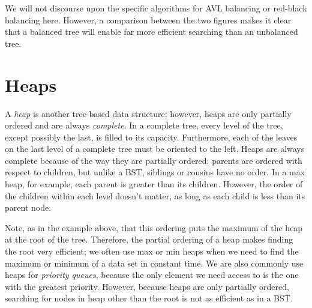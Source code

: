We will not discourse upon the specific algorithms for AVL balancing or red-black balancing here.
However, a comparison between the two figures makes it clear that a balanced tree will enable far more efficient searching than an unbalanced tree.
\section*{Heaps}

A \emph{heap} is another tree-based data structure; however, heaps are only partially ordered and are always \emph{complete}.
In a complete tree, every level of the tree, except possibly the last, is filled to its capacity.
Furthermore, each of the leaves on the last level of a complete tree must be oriented to the left.
Heaps are always complete because of the way they are partially ordered: parents are ordered with respect to children, but unlike a BST, siblings or cousins have no order.
In a max heap, for example, each parent is greater than its children.
However, the order of the children within each level doesn't matter, as long as each child is less than its parent node.
\begin{center}
\end{center}
Note, as in the example above, that this ordering puts the maximum of the heap at the root of the tree.
Therefore, the partial ordering of a heap makes finding the root very efficient; we often use max or min heaps when we need to find the maximum or minimum of a data set in constant time.
We are also commonly use heaps for \emph{priority queues}, because the only element we need access to is the one with the greatest priority.
However, because heaps are only partially ordered, searching for nodes in heap other than the root is not as efficient as in a BST.

